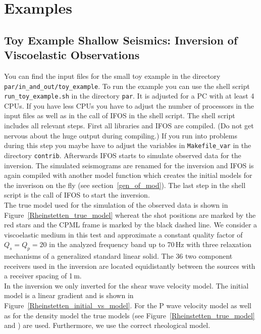 
\chapter{Examples}

\section{Toy Example Shallow Seismics: Inversion of Viscoelastic Observations}
You can find the input files for the small toy example in the directory \texttt{par/in\_and\_out/toy\_example}. To run the example you can use the shell script \texttt{run\_toy\_example.sh} in the directory \texttt{par}. It is adjusted for a PC with at least 4 CPUs. If you have less CPUs you have to adjust the number of processors in the input files as well as in the call of IFOS in the shell script. The shell script includes all relevant steps. First all libraries and IFOS are compiled. (Do not get nervous about the huge output during compiling.) If you run into problems during this step you maybe have to adjust the variables in \texttt{Makefile\_var} in the directory \texttt{contrib}. Afterwards IFOS starts to simulate observed data for the inversion. The simulated seismograms are renamed for the inversion and IFOS is again compiled with another model function which creates the initial models for the inverison on the fly (see section~\ref{gen_of_mod}). The last step in the shell script is the call of IFOS to start the inversion.\\

The true model used for the simulation of the observed data is shown in Figure~\ref{Rheinstetten_true_model} whereat the shot positions are marked by the red stars and the CPML frame is marked by the black dashed line. We consider a viscoelastic medium in this test and approximate a constant quality factor of $Q_s=Q_p=20$ in the analyzed frequency band up to 70\,Hz with three relaxation mechanisms of a generalized standard linear solid. The 36 two component receivers used in the inversion are located equidistantly between the sources with a receiver spacing of 1\,m.\\

In the inversion we only inverted for the shear wave velocity model. The initial model is a linear gradient and is shown in Figure~\ref{Rheinstetten_initial_vs_model}.  For the P wave velocity model as well as for the density model the true models (see Figure~\ref{Rheinstetten_true_model} and ) are used. Furthermore, we use the correct rheological model.\\

